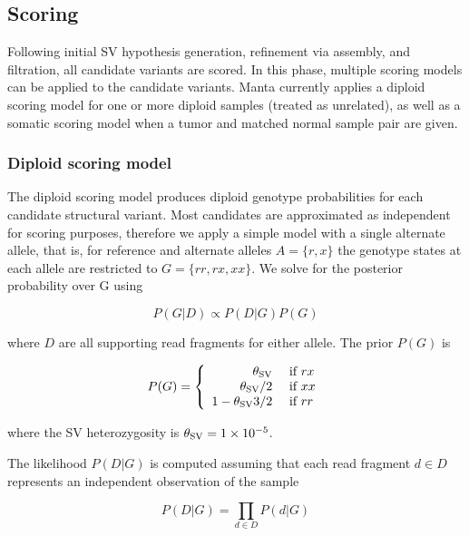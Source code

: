 \documentclass{article}
\newcommand{\e}[1]{\ensuremath{\times 10^{#1}}}
\begin{document}
\subsection{Scoring}

Following initial SV hypothesis generation, refinement via assembly, and filtration, all candidate variants are scored. In this phase, multiple scoring models can be applied to the candidate variants. Manta currently applies a diploid scoring model for one or more diploid samples (treated as unrelated), as well as a somatic scoring model when a tumor and matched normal sample pair are given.

\subsubsection{Diploid scoring model}

The diploid scoring model produces diploid genotype probabilities for each candidate structural variant. Most candidates are approximated as independent for scoring purposes, therefore we apply a simple model with a single alternate allele, that is, for reference and alternate alleles $A = \{r,x\}$ the genotype states at each allele are restricted to $G = \{rr, rx, xx\}$. We solve for the posterior probability over G using

\begin{equation*}
P( G \vert D ) \propto P( D \vert G )  P (G)
\end{equation*}

\noindent
where $D$ are all supporting read fragments for either allele. The prior $P(G)$ is

\newcommand{\thz}{\theta_{\textnormal{SV}}}

\begin{equation*}
P ( G ) =
\left\{
\begin{array}{rl}
\thz      & \mbox{ if $rx$} \\
\thz / 2  & \mbox{ if $xx$} \\
1 - \thz 3 / 2  & \mbox{ if $rr$}
\end{array}
\right.
\end{equation*}

\noindent
where the SV heterozygosity is $\thz = 1\e{-5}$.

The likelihood $P(D \vert G)$ is computed assuming that each read fragment $d \in D$ represents an independent observation of the sample

\begin{equation*}
P(D \vert G) = \prod_{d \in D} P(d \vert G)
\end{equation*}
\end{document}
